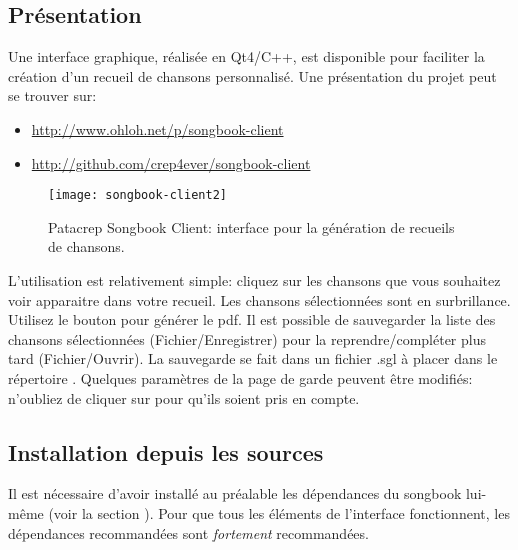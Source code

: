 \documentclass[versionenligne]{framabook}
\newcommand{\Touche}[1]{\Ovalbox{#1}}
\begin{document}
\subsection{Présentation}

Une interface graphique, réalisée en Qt4/C++, est disponible pour
faciliter la création d'un recueil de chansons personnalisé.
Une présentation du projet peut se trouver sur:
\begin{itemize}
\item \url{http://www.ohloh.net/p/songbook-client}
\item \url{http://github.com/crep4ever/songbook-client}
\end{itemize}

\begin{figure}[h]
  \centering
  \texttt{[image: songbook-client2]}
  \caption{Patacrep Songbook Client: interface pour la génération de recueils de chansons.}
  \label{fig:sb-client}
\end{figure}

L'utilisation est relativement simple: cliquez sur les chansons que
vous souhaitez voir apparaitre dans votre recueil.  Les chansons
sélectionnées sont en surbrillance. Utilisez le bouton
\Touche{Générer} pour générer le pdf. Il est possible de sauvegarder
la liste des chansons sélectionnées (Fichier/Enregistrer) pour la
reprendre/compléter plus tard (Fichier/Ouvrir). La sauvegarde se fait
dans un fichier .sgl à placer dans le répertoire
. Quelques paramètres de la page de garde peuvent
être modifiés: n'oubliez de cliquer sur \Touche{Appliquer} pour qu'ils
soient pris en compte.

\subsection{Installation depuis les sources}

\begin{nota}
Il est nécessaire d'avoir installé au préalable les dépendances du
songbook lui-même (voir la section ). Pour que tous les éléments de l'interface
fonctionnent, les dépendances recommandées sont \emph{fortement}
recommandées.
\end{nota}
\end{document}
